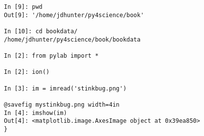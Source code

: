 \documentclass{article}
\begin{document}
\begin{verbatim}
In [9]: pwd
Out[9]: '/home/jdhunter/py4science/book'

In [10]: cd bookdata/
/home/jdhunter/py4science/book/bookdata

In [2]: from pylab import *

In [2]: ion()

In [3]: im = imread('stinkbug.png')

@savefig mystinkbug.png width=4in
In [4]: imshow(im)
Out[4]: <matplotlib.image.AxesImage object at 0x39ea850>
}
\end{verbatim}
\end{document}

